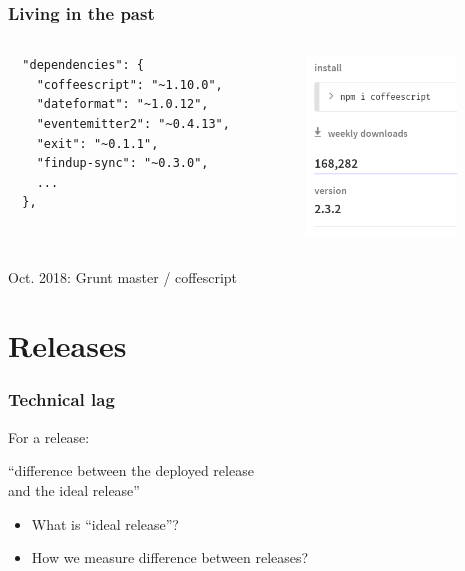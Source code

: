 \documentclass[17pt,aspectratio=169,hyperref=pdfusetitle]{beamer}
\begin{document}
\begin{frame}[fragile]
  \frametitle{Living in the past}

\begin{columns}[T]
\begin{column}{.48\textwidth}

  {\footnotesize
\begin{verbatim}
  "dependencies": {
    "coffeescript": "~1.10.0",
    "dateformat": "~1.0.12",
    "eventemitter2": "~0.4.13",
    "exit": "~0.1.1",
    "findup-sync": "~0.3.0",
    ...
  },
\end{verbatim}
  }

\end{column}%
\hfill%
\begin{column}{.40\textwidth}
  \includegraphics[width=4cm]{figs/coffeescript}
\end{column}%
\end{columns}
  
Oct. 2018: Grunt master / coffescript 
\end{frame}

\section{Releases}

\begin{frame}[fragile]
  \frametitle{Technical lag}

  For a release:

  \vspace{.5cm}
  
  ``difference between the deployed release \\
  and the ideal release'' \\

  \vspace{.5cm}

  \begin{itemize}
  \item What is ``ideal release''?
  \item How we measure difference between releases?
  \end{itemize}
\end{frame}
\end{document}
